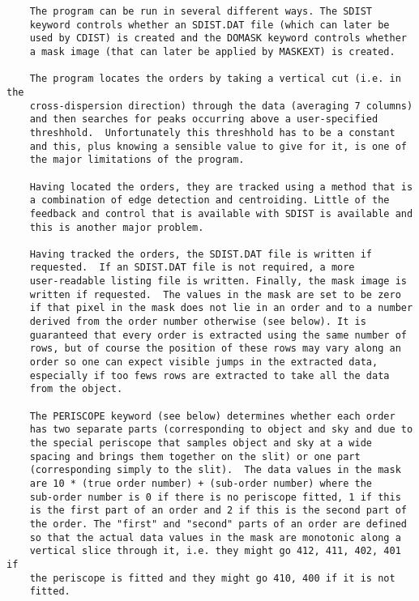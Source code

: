 \begin{description}
\begin{verbatim}
    The program can be run in several different ways. The SDIST
    keyword controls whether an SDIST.DAT file (which can later be
    used by CDIST) is created and the DOMASK keyword controls whether
    a mask image (that can later be applied by MASKEXT) is created.

    The program locates the orders by taking a vertical cut (i.e. in the
    cross-dispersion direction) through the data (averaging 7 columns)
    and then searches for peaks occurring above a user-specified
    threshhold.  Unfortunately this threshhold has to be a constant
    and this, plus knowing a sensible value to give for it, is one of
    the major limitations of the program.

    Having located the orders, they are tracked using a method that is
    a combination of edge detection and centroiding. Little of the
    feedback and control that is available with SDIST is available and
    this is another major problem.

    Having tracked the orders, the SDIST.DAT file is written if
    requested.  If an SDIST.DAT file is not required, a more
    user-readable listing file is written. Finally, the mask image is
    written if requested.  The values in the mask are set to be zero
    if that pixel in the mask does not lie in an order and to a number
    derived from the order number otherwise (see below). It is
    guaranteed that every order is extracted using the same number of
    rows, but of course the position of these rows may vary along an
    order so one can expect visible jumps in the extracted data,
    especially if too fews rows are extracted to take all the data
    from the object.

    The PERISCOPE keyword (see below) determines whether each order
    has two separate parts (corresponding to object and sky and due to
    the special periscope that samples object and sky at a wide
    spacing and brings them together on the slit) or one part
    (corresponding simply to the slit).  The data values in the mask
    are 10 * (true order number) + (sub-order number) where the
    sub-order number is 0 if there is no periscope fitted, 1 if this
    is the first part of an order and 2 if this is the second part of
    the order. The "first" and "second" parts of an order are defined
    so that the actual data values in the mask are monotonic along a
    vertical slice through it, i.e. they might go 412, 411, 402, 401 if
    the periscope is fitted and they might go 410, 400 if it is not
    fitted.


\end{verbatim}
\end{description}
